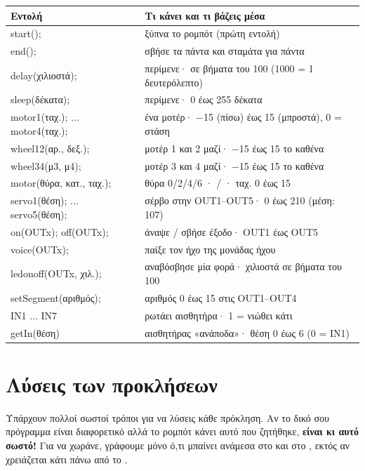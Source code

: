 \documentclass[11pt,a4paper]{article}
\newcommand{\code}[1]{\texttt{\detokenize{#1}}}
\begin{document}
{\small
\renewcommand{\arraystretch}{1.25}
\begin{longtable}{>{\ttfamily}p{} p{}}
\toprule
\textrm{\textbf{Εντολή}} & \textbf{Τι κάνει και τι βάζεις μέσα}\\
\midrule
\endhead
start(); & ξύπνα το ρομπότ (πρώτη εντολή)\\
end(); & σβήσε τα πάντα και σταμάτα για πάντα\\
delay(χιλιοστά); & περίμενε· σε βήματα του 100 (1000 = 1 δευτερόλεπτο)\\
sleep(δέκατα); & περίμενε· 0 έως 255 δέκατα\\
\midrule
motor1(ταχ.); ... motor4(ταχ.); & ένα μοτέρ· −15 (πίσω) έως 15 (μπροστά), 0 = στάση\\
wheel12(αρ., δεξ.); & μοτέρ 1 και 2 μαζί· −15 έως 15 το καθένα\\
wheel34(μ3, μ4); & μοτέρ 3 και 4 μαζί· −15 έως 15 το καθένα\\
motor(θύρα, κατ., ταχ.); & θύρα 0/2/4/6 · \code{DIR_CW} / \code{DIR_CCW} · ταχ. 0 έως 15\\
\midrule
servo1(θέση); ... servo5(θέση); & σέρβο στην OUT1–OUT5· 0 έως 210 (μέση: 107)\\
\midrule
on(OUTx);  off(OUTx); & άναψε / σβήσε έξοδο· OUT1 έως OUT5\\
voice(OUTx); & παίξε τον ήχο της μονάδας ήχου\\
ledonoff(OUTx, χιλ.); & αναβόσβησε μία φορά· χιλιοστά σε βήματα του 100\\
setSegment(αριθμός); & αριθμός 0 έως 15 στις OUT1–OUT4\\
\midrule
IN1 ... IN7 & ρωτάει αισθητήρα· 1 = νιώθει κάτι\\
getIn(θέση) & αισθητήρας «ανάποδα»· θέση 0 έως 6 (0 = IN1)\\
\bottomrule
\end{longtable}}

\section{Λύσεις των προκλήσεων}

Υπάρχουν πολλοί σωστοί τρόποι για να λύσεις κάθε πρόκληση. Αν το δικό σου πρόγραμμα είναι διαφορετικό αλλά
το ρομπότ κάνει αυτό που ζητήθηκε, \textbf{είναι κι αυτό σωστό!} Για να χωράνε, γράφουμε μόνο ό,τι μπαίνει
ανάμεσα στο \code{start();} και στο \code{end();}, εκτός αν χρειάζεται κάτι πάνω από το \code{main}.
\end{document}

